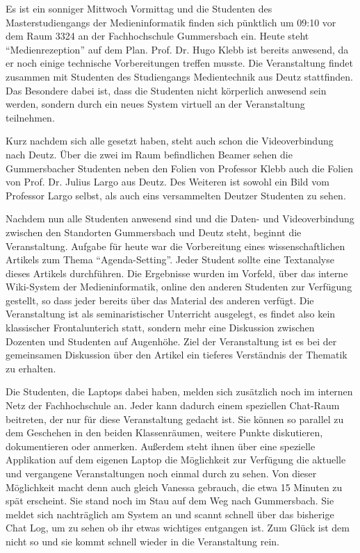 \begin{framed}

  Es ist ein sonniger Mittwoch Vormittag und die Studenten des Masterstudiengangs der Medieninformatik finden sich pünktlich um 09:10 vor dem Raum 3324 an der Fachhochschule Gummersbach ein. Heute steht "`Medienrezeption"' auf dem Plan. Prof. Dr. Hugo Klebb ist bereits anwesend, da er noch einige technische Vorbereitungen treffen musste. Die Veranstaltung  findet zusammen mit Studenten des Studiengangs Medientechnik aus Deutz stattfinden. Das Besondere dabei ist, dass die Studenten nicht körperlich anwesend sein werden, sondern durch ein neues System virtuell an der Veranstaltung teilnehmen.

  Kurz nachdem sich alle gesetzt haben, steht auch schon die Videoverbindung nach Deutz. Über die zwei im Raum befindlichen Beamer sehen die Gummersbacher Studenten neben den Folien von Professor Klebb auch die Folien von Prof. Dr. Julius Largo aus Deutz. Des Weiteren ist sowohl ein Bild vom Professor Largo selbst, als auch eins versammelten Deutzer Studenten zu sehen.
  
  Nachdem nun alle Studenten anwesend sind und die Daten- und Videoverbindung zwischen den Standorten Gummersbach und Deutz steht, beginnt die Veranstaltung. Aufgabe für heute war die Vorbereitung eines wissenschaftlichen Artikels zum Thema "`Agenda-Setting"'. Jeder Student sollte eine Textanalyse dieses Artikels durchführen. Die Ergebnisse wurden im Vorfeld, über das interne Wiki-System der Medieninformatik, online den anderen Studenten zur Verfügung gestellt, so dass jeder bereits über das Material des anderen verfügt. Die Veranstaltung ist als seminaristischer Unterricht ausgelegt, es findet also kein klassischer Frontalunterich statt, sondern mehr eine Diskussion zwischen Dozenten und Studenten auf Augenhöhe. Ziel der Veranstaltung ist es bei der gemeinsamen Diskussion über den Artikel ein tieferes Verständnis der Thematik zu erhalten.

  Die Studenten, die Laptops dabei haben, melden sich zusätzlich noch im internen Netz der Fachhochschule an. Jeder kann dadurch einem speziellen Chat-Raum beitreten, der nur für diese Veranstaltung gedacht ist. Sie können so parallel zu dem Geschehen in den beiden Klassenräumen, weitere Punkte diskutieren, dokumentieren oder anmerken. Außerdem steht ihnen über eine spezielle Applikation auf dem eigenen Laptop die Möglichkeit zur Verfügung die aktuelle und vergangene Veranstaltungen noch einmal durch zu sehen. Von dieser Möglichkeit macht denn auch gleich Vanessa gebrauch, die etwa 15 Minuten zu spät erscheint. Sie stand noch im Stau auf dem Weg nach Gummersbach. Sie meldet sich nachträglich am System an und scannt schnell über das bisherige Chat Log, um zu sehen ob ihr etwas wichtiges entgangen ist. Zum Glück ist dem nicht so und sie kommt schnell wieder in die Veranstaltung rein.


\end{framed}
